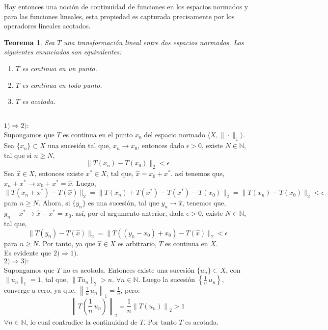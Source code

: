 \documentclass[12pt]{book}
\numberwithin{equation}{chapter}
\newtheorem{theorem}{Teorema}[chapter]
\def\n{\noindent}
\def\la{\langle}
\def\ra{\rangle}
\def\rar{\rightarrow}
\begin{document}
Hay entonces una noci\'on de continuidad de funciones en los espacios normados y para las funciones lineales, esta propiedad es capturada precisamente por los operadores lineales acotados. 
\begin{theorem}\label{T-ac-con}
Sea $T$ una transformaci\'on lineal entre dos espacios normados. Los siguientes enunciados son equivalentes:
\begin{enumerate}
\item $T$ es continua en un punto.
\item $T$ es continua en todo punto.
\item $T$ es acotada.
\end{enumerate}
\end{theorem}
\n {\bf Demostraci\'on}\\
$ 1) \Rightarrow 2) : $\\
Supongamos que $T$ es continua en el punto $x_{0}$ del espacio normado $ \la X, \| \cdot \|_{1} \ra $. Sea $\{x_{n}\} \subset X $ una sucesi\'on tal que, $ x_{n} \rar x_{0} $, entonces dado $\epsilon >0$, existe $ N \in \mathbb{N} $, tal que si $n  \geq N$, 
$$ \| T(x_{n})-T(x_{0}) \|_{2} < \epsilon $$ 
Sea $\hat{x} \in X$, entonces existe $ x^{*} \in X $, tal que, $ \hat{x}= x_{0}+x^{*} $. as\'i tenemos que, $ x_{n}+x^{*} \rar x_{0}+x^{*}=\hat{x} $. Luego,
$$ \| T(x_{n}+x^{*}) - T(\hat{x}) \|_{2}= \| T(x_{n})+T(x^{*}) - T(x^{*})-T(x_{0}) \|_{2}= \| T(x_{n}) - T(x_{0}) \|_{2} < \epsilon $$
para $n \geq N$. Ahora, si $\{y_{n}\}$ es una sucesi\'on, tal que $ y_{n} \rar \hat{x} $, tenemos que, $ y_{n}-x^{*} \rightarrow \hat{x} - x^{*} = x_{0} $. as\'i, por el argumento anterior, dada $\epsilon >0$, existe $ N \in \mathbb{N} $, tal que,
$$ \| T(y_{n}) - T(\hat{x}) \|_{2}= \| T((y_{n}-x_{0})+x_{0}) - T(\hat{x}) \|_{2} < \epsilon $$
para $ n \geq N $. Por tanto, ya que $\hat{x} \in X$ es arbitrario, $T$ es continua en $X$. \\
Es evidente que $ 2) \Rightarrow 1)  $.\\

\n $ 2) \Rightarrow 3) : $\\
Supongamos que $T$ no es acotada. Entonces existe una sucesi\'on $\{ u_{n} \} \subset X$, con $\| u_{n} \|_{1}=1$, tal que, $ \| Tu_{n} \|_{2} > n $, $ \forall n \in \mathbb{N} $. Luego la sucesi\'on $\left\{ \frac{1}{n}\, u_{n}\right\}$, converge a cero, ya que, $ \left\| \frac{1}{n}\, u_{n} \right\|_{1}= \frac{1}{n} $, pero:
$$ \left\| T \left( \frac{1}{n}\, u_{n} \right) \right\|_{2}= \frac{1}{n} \left\| T \left( u_{n} \right) \right\|_{2}> 1 $$
$ \forall n \in \mathbb{N} $, lo cual contradice la continuidad de $T$. Por tanto $T$ es acotada.\\
\end{document}
